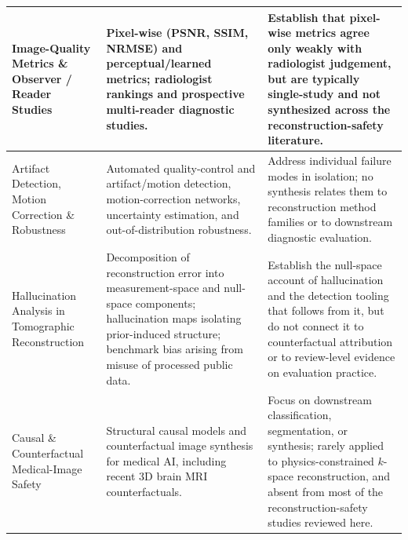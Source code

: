 \documentclass[11pt]{article}
\begin{document}
\begin{table}[t]
\begin{tabular}{
    p{}
    p{}
    p{}
}
Image-Quality Metrics \& Observer / Reader Studies \cite{mason2020comparison,tang2025incorporating,yu2018a,muckley2021results,bash2021deep}
&
Pixel-wise (PSNR, SSIM, NRMSE) and perceptual/learned metrics; radiologist rankings and prospective multi-reader diagnostic studies.
&
Establish that pixel-wise metrics agree only weakly with radiologist judgement, but are typically single-study and not synthesized across the reconstruction-safety literature.
\\
\hline

Artifact Detection, Motion Correction \& Robustness \cite{esteban2017mriqc,fantini2018automatic,sommer2020correction,beljaards2024aibased,khawaled2024npbrec}
&
Automated quality-control and artifact/motion detection, motion-correction networks, uncertainty estimation, and out-of-distribution robustness.
&
Address individual failure modes in isolation; no synthesis relates them to reconstruction method families or to downstream diagnostic evaluation.
\\
\hline

Hallucination Analysis in Tomographic Reconstruction \cite{bhadra2021hallucinations,gottschling2020troublesome}
&
Decomposition of reconstruction error into measurement-space and null-space components; hallucination maps isolating prior-induced structure; benchmark bias arising from misuse of processed public data.
&
Establish the null-space account of hallucination and the detection tooling that follows from it, but do not connect it to counterfactual attribution or to review-level evidence on evaluation practice.
\\
\hline

Causal \& Counterfactual Medical-Image Safety \cite{pawlowski2020deep,castro2020causality,sanchez2022healthy,wei2026latent}
&
Structural causal models and counterfactual image synthesis for medical AI, including recent 3D brain MRI counterfactuals.
&
Focus on downstream classification, segmentation, or synthesis; rarely applied to physics-constrained $k$-space reconstruction, and absent from most of the reconstruction-safety studies reviewed here.
\\
\hline
\end{tabular}
\end{table}
\end{document}
